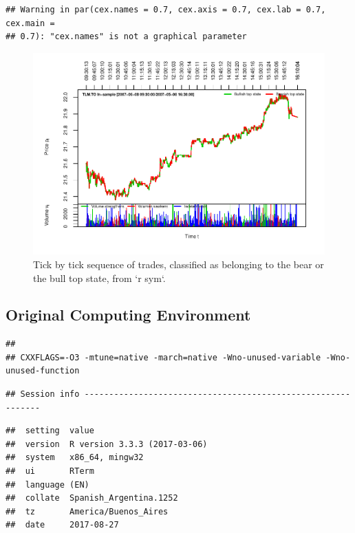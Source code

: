 \documentclass[]{article}
\begin{document}
\begin{verbatim}
## Warning in par(cex.names = 0.7, cex.axis = 0.7, cex.lab = 0.7, cex.main =
## 0.7): "cex.names" is not a graphical parameter
\end{verbatim}

\begin{figure}[H]
\includegraphics[width=\textwidth]{main_files/figure-latex/unnamed-chunk-48-1} \caption{Tick by tick sequence of trades, classified as belonging to the bear or the bull top state, from `r sym`.}\label{fig:unnamed-chunk-48}
\end{figure}

\newpage

\subsection{Original Computing
Environment}\label{original-computing-environment}

\begin{verbatim}
## 
## CXXFLAGS=-O3 -mtune=native -march=native -Wno-unused-variable -Wno-unused-function
\end{verbatim}

\begin{verbatim}
## Session info -------------------------------------------------------------
\end{verbatim}

\begin{verbatim}
##  setting  value                       
##  version  R version 3.3.3 (2017-03-06)
##  system   x86_64, mingw32             
##  ui       RTerm                       
##  language (EN)                        
##  collate  Spanish_Argentina.1252      
##  tz       America/Buenos_Aires        
##  date     2017-08-27
\end{verbatim}
\end{document}
